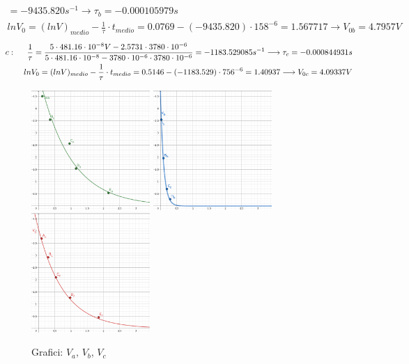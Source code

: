 \begin{center}
\begin{equation}
\begin{split}
            = -9435.820s^{-1} \longrightarrow \tau_b = -0.000105979s
            \\
            ln{V_0} = (ln{V})_{medio} - \frac{1}{\tau}\cdot t_{medio} = 0.0769 - (-9435.820)\cdot158^{-6} = 1.567717 \longrightarrow V_{0b} = 4.7957V
        \end{split}
    \end{equation}
    \begin{equation}
        \begin{split}
            c : \hspace{0.5 cm}\frac{1}{\tau} = \frac{5 \cdot 481.16\cdot10^{-8}V - 2.5731\cdot3780\cdot10^{-6}}{5\cdot481.16\cdot10^{-8} - 3780\cdot10^{-6}\cdot3780\cdot10^{-6}}
            = -1183.529085s^{-1} \longrightarrow \tau_c = -0.000844931s
            \\
            ln{V_0} = (ln{V})_{medio} - \frac{1}{\tau}\cdot t_{medio} = 0.5146 - (-1183.529)\cdot756^{-6} = 1.40937 \longrightarrow V_{0c} = 4.09337V
        \end{split}
    \end{equation}
    \end{center}

    \begin{figure}[!h]
        \begin{center}
            \includegraphics[width = 4.5cm]{Agraph.png}
            \includegraphics[width = 4.5cm]{Bgraph.png}
            \includegraphics[width = 4.5cm]{Cgraph.png}
            \caption{Grafici: \color{green}$V_a$, \color{blue}$V_b$, \color{red}$V_c$}
        \end{center}
    \end{figure}

